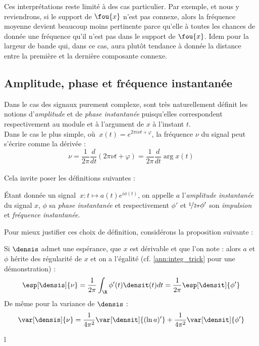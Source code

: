 Ces interprétations reste limité à des cas particulier. Par exemple, et nous y reviendrons, si le support de $\fou{x}$ n'est pas connexe, alors la fréquence moyenne devient beaucoup moins pertinente parce qu'elle à toutes les chances de donnée une fréquence qu'il n'est pas dans le support de $\fou{x}$. Idem pour la largeur de bande qui, dans ce cas, aura plutôt tendance à donnée la distance entre la première et la dernière composante connexe.
\\



\subsection{Amplitude, phase et fréquence instantanée}\label{sec:freq_instant}

Dans le cas des signaux purement complexe, sont très naturellement définit les notions d'\emph{amplitude} et de \emph{phase instantanée} puisqu'elles correspondent respectivement au module et à l'argument de $x$ à l'instant $t$.
\\
Dans le cas le plus simple, où $\ x(t)=e^{2\pi i\nu t + \varphi}$, la fréquence $\nu$ du signal peut s'écrire comme la dérivée :
\[\nu = \frac{1}{2\pi} \frac{d}{dt} (2\pi \nu t + \varphi) = \frac{1}{2\pi} \frac{d}{dt} \arg x(t)\]
\\

Cela invite poser les définitions suivantes :
\begin{definition}
	\'Etant donnée un signal $\ x : t\longmapsto a(t)e^{i\phi(t)}$, on appelle $a$ l'\emph{amplitude instantanée} du signal $x$, $\phi$ sa \emph{phase instantanée} et respectivement $\phi'$ et $\nicefrac{1}{2\pi}\phi'$ son \emph{impulsion} et \emph{fréquence instantanée}.
\end{definition}
\skipl

Pour mieux justifier ces choix de définition, considérons la proposition suivante :

\begin{proposition}\label{prop:mom_freq}
	Si $\densis$ admet une espérance, que $x$ est dérivable et que l'on note :
	alors $a$ et $\phi$ hérite des régularité de $x$ et on a l'égalité (cf. \cref{ann:integ_trick} pour une démonstration) :
	\begin{equation}\label{eq:esp_freq}
		\esp[\densis]{\nu} = \frac{1}{2\pi}\int_\R \phi'(t)\densit(t)dt = \frac{1}{2\pi} \esp[\densit]{\phi'}
	\end{equation}
	De même pour la variance de $\densis$ :
	\begin{equation}\label{eq:var_freq}
		\var[\densis]{\nu} = \frac{1}{4\pi^2}\var[\densit]{(\ln a)'\big.} +\frac{1}{4\pi^2} \var[\densit]{\phi'\big.}
	\end{equation}
\end{proposition}
{\color{white}l} \\
\noindent 

